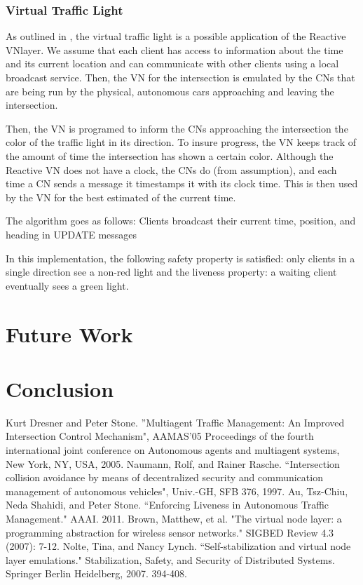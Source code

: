 \documentclass[12pt]{article}
\begin{document}
\subsubsection{Virtual Traffic Light}
As outlined in \cite{vnlayer}, the virtual traffic light is a possible application of the Reactive VNlayer.  We assume that each client has access to information about the time and its current location and can communicate with other clients using a local broadcast service. Then, the VN for the intersection is emulated by the CNs that are being run by the physical, autonomous cars approaching and leaving the intersection. 

Then, the VN is programed to inform the CNs approaching the intersection the color of the traffic light in its direction.  To insure progress, the VN keeps track of the amount of time the intersection has shown a certain color.  Although the Reactive VN does not have a clock, the CNs do  (from assumption), and each time a CN sends a message it timestamps it with its clock time.  This is then used by the VN for the best estimated of the current time.   

The algorithm goes as follows:  Clients broadcast their current time, position, and heading in UPDATE messages


 In this implementation, the following safety property is satisfied: only clients in a single direction see a non-red light and the liveness property: a waiting client eventually sees a green light.
\section{Future Work}
\label{sec:futureWork}


\section{Conclusion}
\label{sec:conclusion}

\pagebreak

\begin{thebibliography}{9}

Kurt Dresner and Peter Stone. ''Multiagent Traffic Management: An Improved Intersection
Control Mechanism", AAMAS'05 Proceedings of the fourth international joint conference on Autonomous agents and multiagent systems, New York, NY, USA, 2005.
Naumann, Rolf, and Rainer Rasche. ``Intersection collision avoidance by means of decentralized security and communication management of autonomous vehicles", Univ.-GH, SFB 376, 1997.
Au, Tsz-Chiu, Neda Shahidi, and Peter Stone. ``Enforcing Liveness in Autonomous Traffic Management." AAAI. 2011.
Brown, Matthew, et al. "The virtual node layer: a programming abstraction for wireless sensor networks." SIGBED Review 4.3 (2007): 7-12.
Nolte, Tina, and Nancy Lynch. ``Self-stabilization and virtual node layer emulations." Stabilization, Safety, and Security of Distributed Systems. Springer Berlin Heidelberg, 2007. 394-408.
\end{thebibliography}
\end{document}
